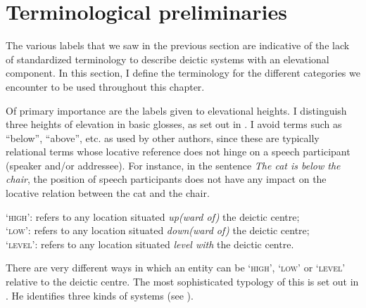 \section{Terminological preliminaries}\label{sec:7:2}
The various labels that we saw in the previous section are indicative of the lack of standardized terminology to describe deictic systems with an elevational component. In this section, I define the terminology for the different categories we encounter to be used throughout this chapter. 

Of primary importance are the labels given to elevational heights. I distinguish three heights of elevation in basic glosses, as set out in . I avoid terms such as ``below'', ``above'', etc. as used by other authors, since these are typically relational terms whose locative reference does not hinge on a speech participant (speaker and/or addressee). For instance, in the sentence \textit{The cat is below the chair}, the position of speech participants does not have any impact on the locative relation between the cat and the chair. 




\ea \label{ex:7:1}
\upshape
`\textsc{high}':   refers to any location situated \textit{up(ward of)} the deictic centre;\\
`\textsc{low}':   refers to any location situated \textit{down(ward of)} the deictic centre;\\
`\textsc{level}':  refers to any location situated \textit{level with} the deictic centre.\\ 
\z


There are very different ways in which an entity can be `\textsc{high}', `\textsc{low}' or `\textsc{level}' relative to the deictic centre. The most sophisticated typology of this is set out in \citet{Burenhult2008}. He identifies three kinds of systems \citep[110-111]{Burenhult2008} (see ).



